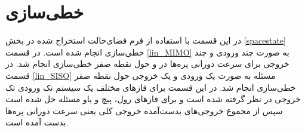 \section{خطی‌سازی}
در این قسمت با استفاده از فرم فضای‌حالت استخراج شده در بخش 
\ref{spacestate}
 خطی‌سازی انجام شده ‌است. در قسمت 
\ref{lin_MIMO}
به صورت چند ورودی و چند خروجی
 برای سرعت دورانی پره‌ها در  
و حول نقطه صفر خطی‌سازی انجام شد. در قسمت \ref{lin_SISO} مسئله به صورت یک ورودی و یک خروجی 
حول نقطه صفر خطی‌سازی انجام شد. در این قسمت برای فازهای مختلف یک سیستم تک ورودی تک خروجی در نظر گرفته ‌شده ‌است و برای فازهای رول، پیچ و یاو مسئله حل شده است  سپس از مجموع خروجی‌های بدست‌آمده خروجی کلی یعنی سرعت دورانی پره‌ها بدست ‌آمده است.